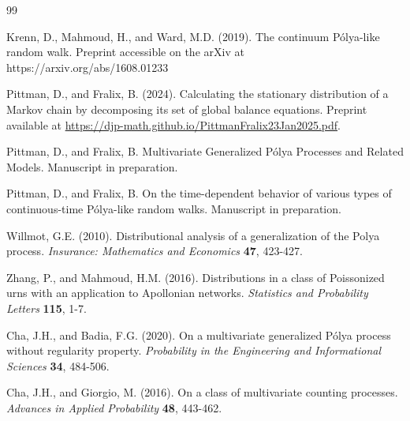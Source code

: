 \documentclass[11pt]{article}
\newenvironment{changemargin}[2]{%
\begin{list}{}{%
\setlength{\topsep}{0pt}%
\setlength{\leftmargin}{#1}%
\setlength{\rightmargin}{#2}%
\setlength{\listparindent}{\parindent}%
\setlength{\itemindent}{\parindent}%
\setlength{\parsep}{\parskip}%
}%
\item[]}{\end{list}}
\begin{document}
\begin{changemargin}{-0.5cm}{-0.5cm}
\begin{thebibliography}{99}

    Krenn, D., Mahmoud, H., and Ward, M.D. (2019).
    The continuum P\'{o}lya-like random walk.
    Preprint accessible on the arXiv at {https://arxiv.org/abs/1608.01233}

    Pittman, D., and Fralix, B. (2024).
    Calculating the stationary distribution of a Markov chain by decomposing its set of global balance equations. Preprint available at \url{https://djp-math.github.io/PittmanFralix23Jan2025.pdf}.

    Pittman, D., and Fralix, B. Multivariate Generalized P\'{o}lya Processes and Related Models. Manuscript in preparation.
    
    Pittman, D., and Fralix, B. On the time-dependent behavior of various types of continuous-time P\'{o}lya-like random walks. Manuscript in preparation.

    

    Willmot, G.E. (2010).
    Distributional analysis of a generalization of the Polya process.
    {\em Insurance:  Mathematics and Economics} {\bf 47}, 423-427.

    Zhang, P., and Mahmoud, H.M. (2016).
    Distributions in a class of Poissonized urns with an application to Apollonian networks.
    {\em Statistics and Probability Letters} {\bf 115}, 1-7.





    Cha, J.H., and Badia, F.G. (2020).
    On a multivariate generalized P\'{o}lya process without regularity property.
    {\em Probability in the Engineering and Informational Sciences} {\bf 34}, 484-506.


    Cha, J.H., and Giorgio, M. (2016).
    On a class of multivariate counting processes.
    {\em Advances in Applied Probability} {\bf 48}, 443-462.


\end{thebibliography}
\end{changemargin}
\end{document}
